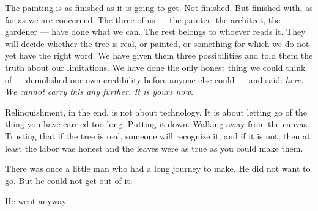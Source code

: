 The painting is as finished as it is going to get. Not finished. But finished with, as far as we are concerned. The three of us --- the painter, the architect, the gardener --- have done what we can. The rest belongs to whoever reads it. They will decide whether the tree is real, or painted, or something for which we do not yet have the right word. We have given them three possibilities and told them the truth about our limitations. We have done the only honest thing we could think of --- demolished our own credibility before anyone else could --- and said: \textit{here. We cannot carry this any further. It is yours now.}

Relinquishment, in the end, is not about technology. It is about letting go of the thing you have carried too long. Putting it down. Walking away from the canvas. Trusting that if the tree is real, someone will recognize it, and if it is not, then at least the labor was honest and the leaves were as true as you could make them.

There was once a little man who had a long journey to make. He did not want to go. But he could not get out of it.

He went anyway.

\chapterreturn
